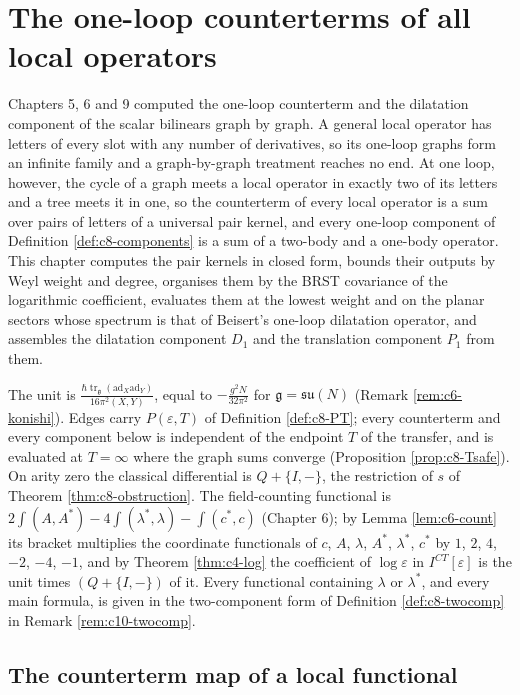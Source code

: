 \chapter{The one-loop counterterms of all local operators}

Chapters 5, 6 and 9 computed the one-loop counterterm and the dilatation component of the scalar bilinears graph by graph. A general local operator has letters of every slot with any number of derivatives, so its one-loop graphs form an infinite family and a graph-by-graph treatment reaches no end. At one loop, however, the cycle of a graph meets a local operator in exactly two of its letters and a tree meets it in one, so the counterterm of every local operator is a sum over pairs of letters of a universal pair kernel, and every one-loop component of Definition \ref{def:c8-components} is a sum of a two-body and a one-body operator. This chapter computes the pair kernels in closed form, bounds their outputs by Weyl weight and degree, organises them by the BRST covariance of the logarithmic coefficient, evaluates them at the lowest weight and on the planar sectors whose spectrum is that of Beisert's one-loop dilatation operator, and assembles the dilatation component $D_1$ and the translation component $P_1$ from them.

The unit is $\frac{\hbar\operatorname{tr}_{\mathfrak g}(\mathrm{ad}_X\mathrm{ad}_Y)}{16\pi^2(X,Y)}$, equal to $-\frac{g^2N}{32\pi^2}$ for $\mathfrak g=\mathfrak{su}(N)$ (Remark \ref{rem:c6-konishi}). Edges carry $P(\varepsilon,T)$ of Definition \ref{def:c8-PT}; every counterterm and every component below is independent of the endpoint $T$ of the transfer, and is evaluated at $T=\infty$ where the graph sums converge (Proposition \ref{prop:c8-Tsafe}). On arity zero the classical differential is $Q+\{I,-\}$, the restriction of $s$ of Theorem \ref{thm:c8-obstruction}. The field-counting functional is $2\int(A,A^*)-4\int(\lambda^*,\lambda)-\int(c^*,c)$ (Chapter 6); by Lemma \ref{lem:c6-count} its bracket multiplies the coordinate functionals of $c$, $A$, $\lambda$, $A^*$, $\lambda^*$, $c^*$ by $1$, $2$, $4$, $-2$, $-4$, $-1$, and by Theorem \ref{thm:c4-log} the coefficient of $\log\varepsilon$ in $I^{CT}[\varepsilon]$ is the unit times $(Q+\{I,-\})$ of it. Every functional containing $\lambda$ or $\lambda^*$, and every main formula, is given in the two-component form of Definition \ref{def:c8-twocomp} in Remark \ref{rem:c10-twocomp}.

\section{The counterterm map of a local functional}

